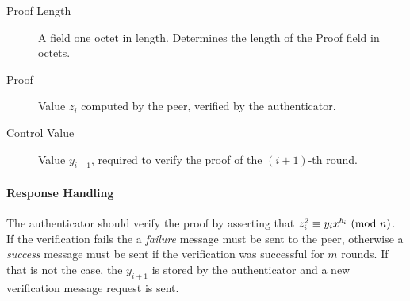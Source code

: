 \begin{description}
	\item [Proof Length] A field one octet in length. Determines the length of the Proof field in octets.
	\item [Proof] Value $z_i$ computed by the peer, verified by the authenticator.
	\item [Control Value] Value $y_{i+1}$, required to verify the proof of the $(i+1)$-th round.
\end{description}

\paragraph{Response Handling}
The authenticator should verify the proof by asserting that $z_i^2 \equiv y_ix^{b_i} \ (\mathrm{mod}\ n)$.
If the verification fails the a \textit{failure} message must be sent to the peer, otherwise a \textit{success} message must be sent if the verification was successful for $m$ rounds.
If that is not the case, the $y_{i+1}$ is stored by the authenticator and a new verification message request is sent.

